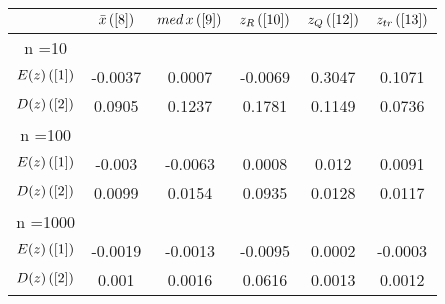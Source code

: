 \begin{tabular}{|c|c|c|c|c|c|}
\hline
 & $\bar{x} \, (\ref{8})$ & $med \, x \, (\ref{9})$ & $z_R \, (\ref{10})$ & $z_Q \, (\ref{12})$ & $z_{tr} \, (\ref{13})$ \\
\hline
n =10 &  &  &  &  & \\
\hline
$E(z) \, (\ref{1})$ & -0.0037 & 0.0007 & -0.0069 & 0.3047 & 0.1071\\
\hline
$D(z) \, (\ref{2})$ & 0.0905 & 0.1237 & 0.1781 & 0.1149 & 0.0736\\
\hline
n =100 &  &  &  &  & \\
\hline
$E(z) \, (\ref{1})$ & -0.003 & -0.0063 & 0.0008 & 0.012 & 0.0091\\
\hline
$D(z) \, (\ref{2})$ & 0.0099 & 0.0154 & 0.0935 & 0.0128 & 0.0117\\
\hline
n =1000 &  &  &  &  & \\
\hline
$E(z) \, (\ref{1})$ & -0.0019 & -0.0013 & -0.0095 & 0.0002 & -0.0003\\
\hline
$D(z) \, (\ref{2})$ & 0.001 & 0.0016 & 0.0616 & 0.0013 & 0.0012\\
\hline
\end{tabular}